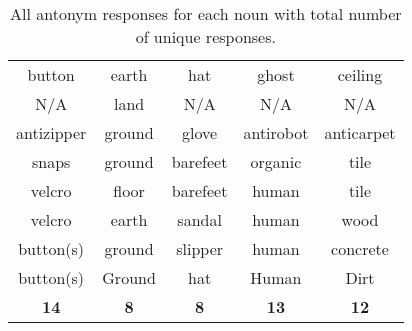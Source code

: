 \begin{table}
\begin{center}
\begin{tabular}{|c|c|c|c|c|}
			button	&	earth	&	hat	&	ghost	&	ceiling		\\
			N/A	&	land	&	N/A	&	N/A	&	N/A		\\
			antizipper	&	ground	&	glove	&	antirobot	&	anticarpet		\\
			snaps	&	ground	&	barefeet	&	organic	&	tile		\\
			velcro 	&	floor	&	barefeet	&	human	&	tile		\\
			velcro	&	earth	&	sandal	&	human	&	wood		\\
			button(s)	&	ground	&	slipper	&	human	&	concrete		\\
			button(s)	&	Ground	&	hat	&	Human	&	Dirt		\\ \hline
			\textbf{14}	&	\textbf{8}	&	\textbf{8}	&	\textbf{13}	&	\textbf{12}		\\
			\hline
		\end{tabular}
	\end{center}
	\caption {All antonym responses for each noun with total number of unique responses.}
	\label{tab:all_noun}
\end{table}